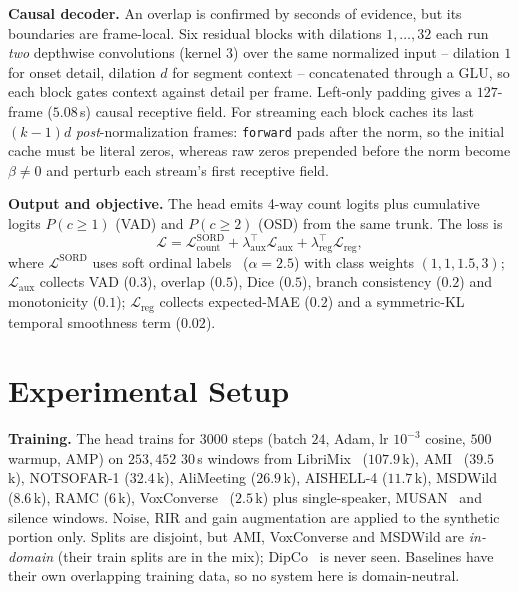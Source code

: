 \documentclass[10pt,conference]{IEEEtran}
\begin{document}
\textbf{Causal decoder.} An overlap is confirmed by seconds of evidence, but
its boundaries are frame-local. Six residual blocks with dilations
$1,\dots,32$ each run \emph{two} depthwise convolutions (kernel $3$) over
the same normalized input -- dilation $1$ for onset detail, dilation $d$ for
segment context -- concatenated through a GLU, so each block gates context
against detail per frame. Left-only padding gives a $127$-frame ($5.08$\,s)
causal receptive field. For streaming each block caches its last
$(k\!-\!1)d$ \emph{post}-normalization frames: \texttt{forward} pads after
the norm, so the initial cache must be literal zeros, whereas raw zeros
prepended before the norm become $\beta\!\neq\!0$ and perturb each stream's
first receptive field.

\textbf{Output and objective.} The head emits 4-way count logits plus
cumulative logits $P(c\!\geq\!1)$ (VAD) and $P(c\!\geq\!2)$ (OSD) from the
same trunk. The loss is
\begin{equation}
\mathcal{L}=\mathcal{L}^{\text{SORD}}_{\text{count}}
+\lambda_{\text{aux}}^{\top}\mathcal{L}_{\text{aux}}
+\lambda_{\text{reg}}^{\top}\mathcal{L}_{\text{reg}},
\end{equation}
where $\mathcal{L}^{\text{SORD}}$ uses soft ordinal
labels~\cite{diaz2019sord} ($\alpha\!=\!2.5$) with class weights
$(1,1,1.5,3)$; $\mathcal{L}_{\text{aux}}$ collects VAD ($0.3$), overlap
($0.5$), Dice ($0.5$), branch consistency ($0.2$) and monotonicity ($0.1$);
$\mathcal{L}_{\text{reg}}$ collects expected-MAE ($0.2$) and a
symmetric-KL temporal smoothness term ($0.02$).

\section{Experimental Setup}

\textbf{Training.} The head trains for $3000$ steps (batch $24$, Adam,
lr $10^{-3}$ cosine, $500$ warmup, AMP) on $253{,}452$ $30$\,s windows from
LibriMix~\cite{cosentino2020librimix} ($107.9$\,k),
AMI~\cite{carletta2005ami} ($39.5$\,k), NOTSOFAR-1 ($32.4$\,k), AliMeeting
($26.9$\,k), AISHELL-4 ($11.7$\,k), MSDWild~\cite{liu2022msdwild}
($8.6$\,k), RAMC ($6$\,k), VoxConverse~\cite{chung2020voxconverse}
($2.5$\,k) plus single-speaker, MUSAN~\cite{snyder2015musan} and silence
windows. Noise, RIR and gain augmentation are applied to the synthetic
portion only. Splits are disjoint, but AMI, VoxConverse and MSDWild are
\emph{in-domain} (their train splits are in the mix);
DipCo~\cite{vansegbroeck2020dipco} is never seen. Baselines have their own
overlapping training data, so no system here is domain-neutral.
\end{document}

